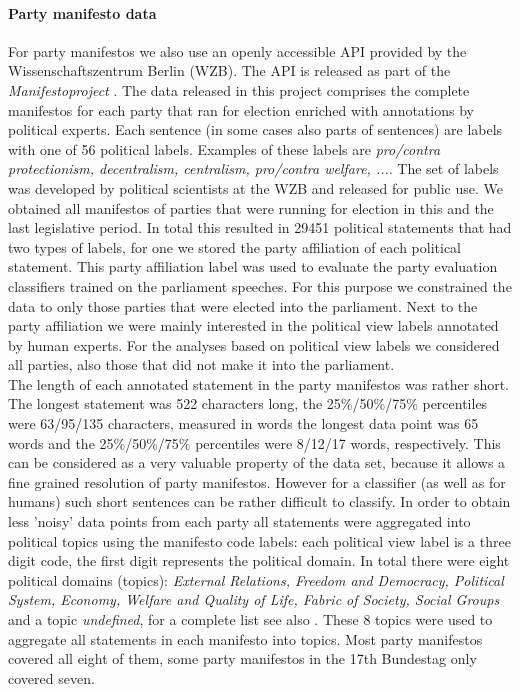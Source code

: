 \documentclass[runningheads,a4paper]{llncs}
\begin{document}
\paragraph{Party manifesto data}
For party manifestos we also use an openly accessible API provided by the Wissenschaftszentrum Berlin (WZB). The API is released as part of the {\em Manifestoproject} \cite{manifesto}. The data released in this project comprises the complete manifestos for each party that ran for election enriched with annotations by political experts. Each sentence (in some cases also parts of sentences) are labels with one of 56 political labels. Examples of these labels are {\em pro/contra protectionism, decentralism, centralism, pro/contra welfare, ...}. The set of labels was developed by political scientists at the WZB and released for public use. We obtained all manifestos of parties that were running for election in this and the last legislative period. In total this resulted in 29451 political statements that had two types of labels, for one we stored the party affiliation of each political statement. This party affiliation label was used to evaluate the party evaluation classifiers trained on the parliament speeches. For this purpose we constrained the data to only those parties that were elected into the parliament. Next to the party affiliation we were mainly interested in the political view labels annotated by human experts. For the analyses based on political view labels we considered all parties, also those that did not make it into the parliament. \\
The length of each annotated statement in the party manifestos was rather short. The longest statement was 522 characters long, the 25\%/50\%/75\% percentiles were 63/95/135 characters, measured in words the longest data point was 65 words and the 25\%/50\%/75\% percentiles were 8/12/17 words, respectively. This can be considered as a very valuable property of the data set, because it allows a fine grained resolution of party manifestos. However for a classifier (as well as for humans) such short sentences can be rather difficult to classify. In order to obtain less 'noisy' data points from each party all statements were aggregated into political topics using the manifesto code labels: each political view label is a three digit code, the first digit represents the political domain. In total there were eight political domains (topics): {\em External Relations, Freedom and Democracy, Political System, Economy, Welfare and Quality of Life, Fabric of Society, Social Groups} and a topic {\em undefined}, for a complete list see also \cite{leftright}. These 8 topics were used to aggregate all statements in each manifesto into topics. Most party manifestos covered all eight of them, some party manifestos in the 17th Bundestag only covered seven. 
\end{document}
